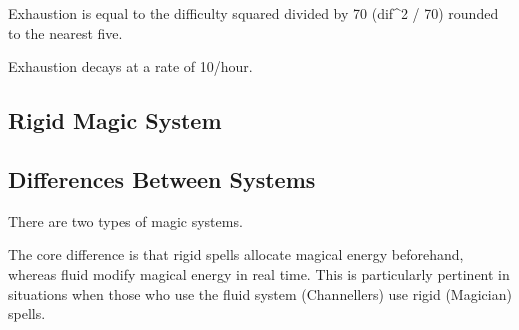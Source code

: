 \documentclass[]{article}
\begin{document}
Exhaustion is equal to the difficulty squared divided by 70 (dif\^{}2 /
70) rounded to the nearest five.

Exhaustion decays at a rate of 10/hour.

\subsection{Rigid Magic System}\label{rigid-magic-system}

\subsection{Differences Between
Systems}\label{differences-between-systems}

There are two types of magic systems.

The core difference is that rigid spells allocate magical energy
beforehand, whereas fluid modify magical energy in real time. This is
particularly pertinent in situations when those who use the fluid system
(Channellers) use rigid (Magician) spells.
\end{document}
